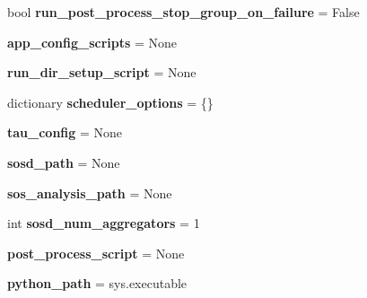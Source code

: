 \begin{DoxyCompactItemize}
bool {\bfseries run\+\_\+post\+\_\+process\+\_\+stop\+\_\+group\+\_\+on\+\_\+failure} = False
\item 
\mbox{\label{classcodar_1_1cheetah_1_1model_1_1_campaign_a434f06408e6b364e0efc232fa107eb33}} 
{\bfseries app\+\_\+config\+\_\+scripts} = None
\item 
\mbox{\label{classcodar_1_1cheetah_1_1model_1_1_campaign_aa7d421cedfa8ffb615f6fd8f38b208ef}} 
{\bfseries run\+\_\+dir\+\_\+setup\+\_\+script} = None
\item 
\mbox{\label{classcodar_1_1cheetah_1_1model_1_1_campaign_a6c58ab5dac64e6ab4796c6e6de6347c7}} 
dictionary {\bfseries scheduler\+\_\+options} = \{\}
\item 
\mbox{\label{classcodar_1_1cheetah_1_1model_1_1_campaign_a28e44a6ede93e17d40627bd9a31fa8d3}} 
{\bfseries tau\+\_\+config} = None
\item 
\mbox{\label{classcodar_1_1cheetah_1_1model_1_1_campaign_af655e512e1d8b7a3bd5104d890dab023}} 
{\bfseries sosd\+\_\+path} = None
\item 
\mbox{\label{classcodar_1_1cheetah_1_1model_1_1_campaign_a521eea7dac8df14f3ea9174cd6297340}} 
{\bfseries sos\+\_\+analysis\+\_\+path} = None
\item 
\mbox{\label{classcodar_1_1cheetah_1_1model_1_1_campaign_a8cdebf43b605e4ac036fbf4e0b9e7d15}} 
int {\bfseries sosd\+\_\+num\+\_\+aggregators} = 1
\item 
\mbox{\label{classcodar_1_1cheetah_1_1model_1_1_campaign_a7452ae0f9b6946a5e531cf6bebd55179}} 
{\bfseries post\+\_\+process\+\_\+script} = None
\item 
\mbox{\label{classcodar_1_1cheetah_1_1model_1_1_campaign_af71218dfabb60e7f23997a0a8f1e1158}} 
{\bfseries python\+\_\+path} = sys.\+executable
\end{DoxyCompactItemize}


